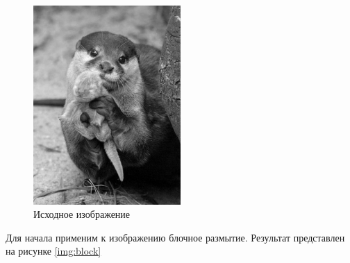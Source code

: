 \begin{figure}[ht!]
    \centering
    \includegraphics[width=0.5\textwidth]{bw.png}
    \caption{Исходное изображение}
    \label{img:src2}
\end{figure}

Для начала применим к изображению блочное размытие. Результат представлен на рисунке \ref{img:block}

